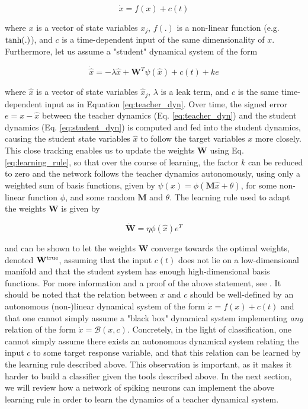 \documentclass[twoside,11pt,titlepage]{article}
\begin{document}
\begin{equation} \label{eq:teacher_dyn}
  \dot{x} = f(x) + c(t)
\end{equation}

where $x$ is a vector of state variables $x_j$, $f(.)$ is a non-linear function (e.g. $\textnormal{tanh}(.)$), and $c$ is a time-dependent input of the same dimensionality of $x$.
Furthermore, let us assume a "student" dynamical system of the form

\begin{equation} \label{eq:student_dyn}
  \dot{\hat{x}} = -\lambda \hat{x} + \mathbf{W}^T \psi(\hat{x}) + c(t) + ke
\end{equation}

where $\hat{x}$ is a vector of state variables $\hat{x}_j$, $\lambda$ is a leak term, and $c$ is the same time-dependent input as in Equation \ref{eq:teacher_dyn}.
Over time, the signed error $e = x - \hat{x}$ between the teacher dynamics (Eq. \ref{eq:teacher_dyn}) and the student dynamics (Eq. \ref{eq:student_dyn}) is computed
and fed into the student dynamics, causing the student state variables $\hat{x}$ to follow the target variables $x$ more closely. This close tracking enables
us to update the weights $\mathbf{W}$ using Eq. \ref{eq:learning_rule}, so that over the course of learning, the factor $k$ can be reduced to zero and the network follows the teacher dynamics
autonomously, using only a weighted sum of basis functions, given by $\psi(x)=\phi(\mathbf{M}\hat{x}+\theta)$, for some non-linear function $\phi$, and some random $\mathbf{M}$ and $\theta$.
The learning rule used to adapt the weights $\mathbf{W}$ is given by

\begin{equation} \label{eq:learning_rule}
  \dot{\mathbf{W}} = \eta \phi(\hat{x})e^T
\end{equation}

and can be shown to let the weights $\mathbf{W}$ converge towards the optimal weights, denoted $\mathbf{W}^\textnormal{true}$, assuming that the input $c(t)$ does not lie on a
low-dimensional manifold and that the student system has enough high-dimensional basis functions. For more information and a proof of the above statement, see \cite{alemi2017learning}.
It should be noted that the relation between $x$ and $c$ should be well-defined by an autonomous (non-)linear dynamical system of the form $\dot{x} = f(x)+c(t)$ and that one cannot
simply assume a "black box" dynamical system implementing \textit{any} relation of the form $\dot{x} = \mathcal{B}(x,c)$. Concretely, in the light of classification, one cannot simply
assume there exists an autonomous dynamical system relating the input $c$ to some target response variable, and that this relation can be learned by the learning rule described above.
This observation is important, as it makes it harder to build a classifier given the tools described above. In the next section, we will review how a network of spiking neurons can
implement the above learning rule in order to learn the dynamics of a teacher dynamical system.
\end{document}
